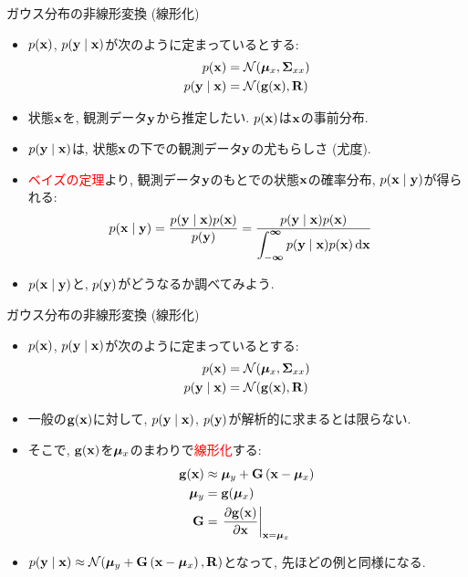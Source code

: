 \documentclass[dvipdfmx,notheorems,t]{beamer}
\begin{document}
\begin{frame}{ガウス分布の非線形変換 (線形化)}
\begin{itemize}
  \item $p(\vb{x})$, $p(\vb{y} \mid \vb{x})$が次のように定まっているとする:
  \begin{align*}
    p(\vb{x}) &= \mathcal{N}(\vb*{\mu}_x, \vb{\Sigma}_{xx}) \\
    p(\vb{y} \mid \vb{x}) &= \mathcal{N}(\vb{g}(\vb{x}), \vb{R})
  \end{align*}
  \item 状態$\vb{x}$を, 観測データ$\vb{y}$から推定したい. $p(\vb{x})$は$\vb{x}$の事前分布.
  \item $p(\vb{y} \mid \vb{x})$は, 状態$\vb{x}$の下での観測データ$\vb{y}$の尤もらしさ (尤度).
  \item \textcolor{red}{ベイズの定理}より, 観測データ$\vb{y}$のもとでの状態$\vb{x}$の確率分布,
  $p(\vb{x} \mid \vb{y})$が得られる:
  \begin{align*}
    p(\vb{x} \mid \vb{y}) &= \frac{p(\vb{y} \mid \vb{x}) p(\vb{x})}{p(\vb{y})}
      = \frac{p(\vb{y} \mid \vb{x}) p(\vb{x})}{
      \displaystyle \int_{-\boldsymbol{\infty}}^{\boldsymbol{\infty}}
      p(\vb{y} \mid \vb{x}) p(\vb{x}) \dd{\vb{x}}}
  \end{align*}
  \item $p(\vb{x} \mid \vb{y})$と, $p(\vb{y})$がどうなるか調べてみよう.
\end{itemize}
\end{frame}

\begin{frame}{ガウス分布の非線形変換 (線形化)}
\begin{itemize}
  \item $p(\vb{x})$, $p(\vb{y} \mid \vb{x})$が次のように定まっているとする:
  \begin{align*}
    p(\vb{x}) &= \mathcal{N}(\vb*{\mu}_x, \vb{\Sigma}_{xx}) \\
    p(\vb{y} \mid \vb{x}) &= \mathcal{N}(\vb{g}(\vb{x}), \vb{R})
  \end{align*}
  \item 一般の$\vb{g}(\vb{x})$に対して, $p(\vb{y} \mid \vb{x})$, $p(\vb{y})$が解析的に求まるとは限らない.
  \item そこで, $\vb{g}(\vb{x})$を$\vb*{\mu}_x$のまわりで\textcolor{red}{線形化}する:
  \begin{align*}
    \vb{g}(\vb{x}) &\approx \vb*{\mu}_y + \vb{G} \left( \vb{x} - \vb*{\mu}_x \right) \\
    \vb*{\mu}_y &= \vb{g}(\vb*{\mu}_x) \\
    \vb{G} &= \left. \pdv{\vb{g}(\vb{x})}{\vb{x}} \right|_{\vb{x} = \vb*{\mu}_x}
  \end{align*}
  \item $p(\vb{y} \mid \vb{x}) \approx \mathcal{N}(\vb*{\mu}_y + \vb{G} \left( \vb{x} - \vb*{\mu}_x \right), \vb{R})$となって,
  先ほどの例と同様になる.
\end{itemize}
\end{frame}
\end{document}
